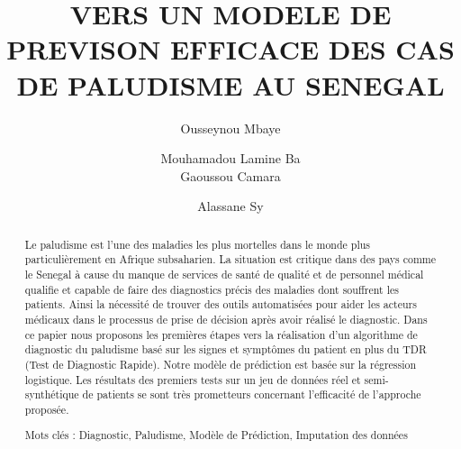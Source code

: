 \documentclass[runningheads]{llncs}
\begin{document}
%
\title{VERS UN MODELE DE PREVISON EFFICACE DES CAS DE PALUDISME AU SENEGAL}
%
%
\author{Ousseynou Mbaye \and Mouhamadou Lamine Ba \\ Gaoussou Camara \and Alassane Sy}
%
%
%
\maketitle              %
%
\begin{abstract}
Le paludisme est l’une des maladies les plus mortelles dans le monde plus particulièrement en Afrique subsaharien. La situation est critique dans des pays comme le Senegal à cause du manque de services de santé  de qualité et de personnel médical qualifie et capable de faire des diagnostics précis des maladies dont souffrent les patients.
Ainsi la nécessité de trouver des outils automatisées pour aider les acteurs médicaux dans le processus de prise de décision après avoir réalisé le diagnostic.
Dans ce papier nous proposons les premières étapes vers la réalisation d’un algorithme de diagnostic du paludisme basé sur les signes et symptômes du patient en plus du TDR (Test de Diagnostic Rapide). Notre modèle de prédiction est basée sur la régression logistique.
Les résultats des premiers tests sur un jeu de données  réel et semi-synthétique de patients se sont très prometteurs concernant l’efficacité de l’approche proposée.

 Mots clés : Diagnostic, Paludisme, Modèle de Prédiction, Imputation des données

\end{abstract}
%
%












%
%
%


%
\end{document}
